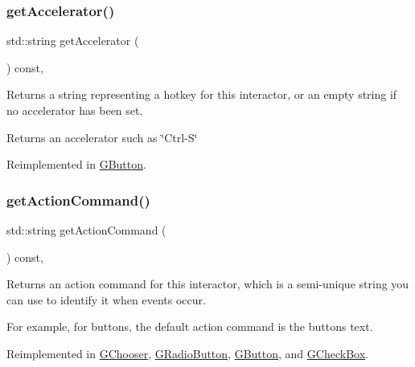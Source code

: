\subsubsection{\texorpdfstring{get\+Accelerator()}{getAccelerator()}}
{\footnotesize\ttfamily std\+::string get\+Accelerator (\begin{DoxyParamCaption}{ }\end{DoxyParamCaption}) const\hspace{0.3cm}{\ttfamily [virtual]}, {\ttfamily [inherited]}}



Returns a string representing a hotkey for this interactor, or an empty string if no accelerator has been set. 

\begin{DoxyReturn}{Returns}
an accelerator such as \char`\"{}\+Ctrl-\/\+S\char`\"{} 
\end{DoxyReturn}


Reimplemented in \mbox{\hyperlink{classGButton_a57806dc9defb73f76f493f8548319924}{G\+Button}}.

\mbox{\label{classGInteractor_a94eb4276000c4fdfb508ce9e6317a82a}} 
\subsubsection{\texorpdfstring{get\+Action\+Command()}{getActionCommand()}}
{\footnotesize\ttfamily std\+::string get\+Action\+Command (\begin{DoxyParamCaption}{ }\end{DoxyParamCaption}) const\hspace{0.3cm}{\ttfamily [virtual]}, {\ttfamily [inherited]}}



Returns an action command for this interactor, which is a semi-\/unique string you can use to identify it when events occur. 

For example, for buttons, the default action command is the button\textquotesingle{}s text. 

Reimplemented in \mbox{\hyperlink{classGChooser_a4f83505141da1f8446f0e0e0a9507930}{G\+Chooser}}, \mbox{\hyperlink{classGRadioButton_a4f83505141da1f8446f0e0e0a9507930}{G\+Radio\+Button}}, \mbox{\hyperlink{classGButton_a4f83505141da1f8446f0e0e0a9507930}{G\+Button}}, and \mbox{\hyperlink{classGCheckBox_a4f83505141da1f8446f0e0e0a9507930}{G\+Check\+Box}}.

